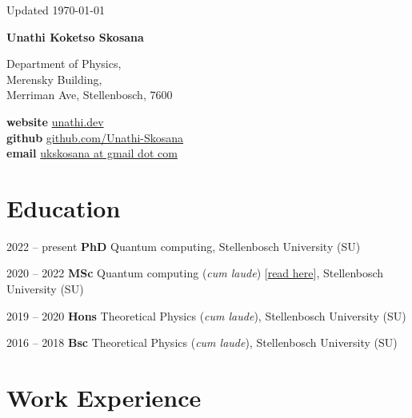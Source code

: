 \documentclass[10pt]{extreport}
\newcommand*{\name}{Unathi Koketso Skosana}
\newcommand{\namefont}[1]{{\normalfont\bfseries\Huge{#1}}}
\begin{document}
    \begin{center}
        \vfill
        \small {Updated \monthyeardate\today}
    \end{center}

    \vspace{2em}

    \namefont{\name}

    \vspace{1em}

    \begin{minipage}[t]{0.45\linewidth}
      Department of Physics, \\
      Merensky Building, \\
      Merriman Ave, Stellenbosch, 7600
    \end{minipage}
    \hfill
    \begin{minipage}[t]{0.5\linewidth}
        \textbf{website} \href{https://www.unathi.dev}{unathi.dev} \\
        \textbf{github}  \href{https://www.github.com/Unathi-Skosana}{github.com/Unathi-Skosana}  \\
        \textbf{email} \href{mailto:ukskosana@gmail.com}{ukskosana at gmail dot com} \hfill
    \end{minipage}

    \section*{Education}

    \begin{tablist}
      \item[2022 -- present]     \tab{}\textbf{PhD} Quantum computing, Stellenbosch University (SU)
      \item[2020 -- 2022] \tab{}\textbf{MSc} Quantum computing (\textit{cum laude}) [\href{https://github.com/Unathi-Skosana/mastersthesis}{read here}], Stellenbosch University (SU)
      \item[2019 -- 2020]  \tab{}\textbf{Hons} Theoretical Physics (\textit{cum laude}), Stellenbosch University (SU)
      \item[2016 -- 2018]  \tab{}\textbf{Bsc} Theoretical Physics (\textit{cum laude}), Stellenbosch University (SU)
    \end{tablist}

    \section*{Work Experience}
\end{document}

